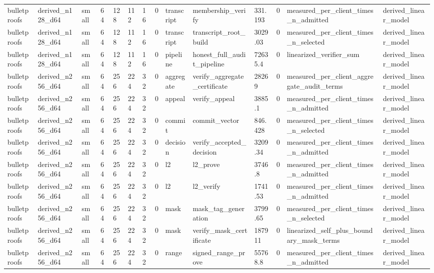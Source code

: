 \begin{table}[t]
\begin{tabular}{llllllllllllll}
bulletproofs & derived\_n128\_d64 & small & 64 & 128 & 112 & 16 & 0 & transcript & membership\_verify & 331.193 & 0 & measured\_per\_client\_times\_n\_admitted & derived\_linear\_model \\
bulletproofs & derived\_n128\_d64 & small & 64 & 128 & 112 & 16 & 0 & transcript & transcript\_root\_build & 3029.03 & 0 & measured\_per\_client\_times\_n\_selected & derived\_linear\_model \\
bulletproofs & derived\_n128\_d64 & small & 64 & 128 & 112 & 16 & 0 & pipeline & honest\_full\_audit\_pipeline & 72635.4 & 0 & linearized\_verifier\_sum & derived\_linear\_model \\
bulletproofs & derived\_n256\_d64 & small & 64 & 256 & 224 & 32 & 0 & aggregate & verify\_aggregate\_certificate & 28269 & 0 & measured\_per\_client\_aggregate\_audit\_terms & derived\_linear\_model \\
bulletproofs & derived\_n256\_d64 & small & 64 & 256 & 224 & 32 & 0 & appeal & verify\_appeal & 3885.1 & 0 & measured\_per\_client\_times\_n\_admitted & derived\_linear\_model \\
bulletproofs & derived\_n256\_d64 & small & 64 & 256 & 224 & 32 & 0 & commit & commit\_vector & 846.428 & 0 & measured\_per\_client\_times\_n\_selected & derived\_linear\_model \\
bulletproofs & derived\_n256\_d64 & small & 64 & 256 & 224 & 32 & 0 & decision & verify\_accepted\_decision & 3209.34 & 0 & measured\_per\_client\_times\_n\_admitted & derived\_linear\_model \\
bulletproofs & derived\_n256\_d64 & small & 64 & 256 & 224 & 32 & 0 & l2 & l2\_prove & 3746.8 & 0 & measured\_per\_client\_times\_n\_admitted & derived\_linear\_model \\
bulletproofs & derived\_n256\_d64 & small & 64 & 256 & 224 & 32 & 0 & l2 & l2\_verify & 1741.53 & 0 & measured\_per\_client\_times\_n\_admitted & derived\_linear\_model \\
bulletproofs & derived\_n256\_d64 & small & 64 & 256 & 224 & 32 & 0 & mask & mask\_tag\_generation & 3799.65 & 0 & measured\_per\_client\_times\_n\_selected & derived\_linear\_model \\
bulletproofs & derived\_n256\_d64 & small & 64 & 256 & 224 & 32 & 0 & mask & verify\_mask\_certificate & 187911 & 0 & linearized\_self\_plus\_boundary\_mask\_terms & derived\_linear\_model \\
bulletproofs & derived\_n256\_d64 & small & 64 & 256 & 224 & 32 & 0 & range & signed\_range\_prove & 55768.8 & 0 & measured\_per\_client\_times\_n\_admitted & derived\_linear\_model \\

\end{tabular}
\end{table}
